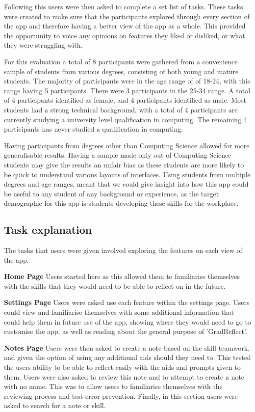 \documentclass{l4proj}
\begin{document}
Following this users were then asked to complete a set list of tasks. These tasks were created to make sure that the participants explored through every section of the app and therefore having a better view of the app as a whole. This provided the opportunity to voice any opinions on features they liked or disliked, or what they were struggling with. 

For this evaluation a total of 8 participants were gathered from a convenience sample of students from various degrees, consisting of both young and mature students. The majority of participants were in the age range of of 18-24, with this range having 5 participants. There were 3 participants in the 25-34 range. A total of 4 participants identified as female, and 4 participants identified as male. Most students had a strong technical background, with a total of 4 participants are currently studying a university level qualification in computing. The remaining 4 participants has never studied a qualification in computing.

Having participants from degrees other than Computing Science allowed for more generalisable results. Having a sample made only out of Computing Science students may give the results an unfair bias as these students are more likely to be quick to understand various layouts of interfaces. Using students from multiple degrees and age ranges, meant that we could give insight into how this app could be useful to any student of any background or experience, as the target demographic for this app is students developing these skills for the workplace.

\subsection{Task explanation}

The tasks that users were given involved exploring the features on each view of the app.

\textbf{Home Page} Users started here as this allowed them to familiarise themselves with the skills that they would need to be able to reflect on in the future. 
 
\textbf{Settings Page} Users were asked use each feature within the settings page. Users could view and familiarise themselves with some additional information that could help them in future use of the app, showing where they would need to go to customise the app, as well as reading about the general purpose of 'GradReflect'.

\textbf{Notes Page} Users were then asked to create a note based on the skill teamwork, and given the option of using any additional aids should they need to. This tested the users ability to be able to reflect easily with the aids and prompts given to them. Users were also asked to review this note and to attempt to create a note with no name. This was to allow users to familiarise themselves with the reviewing process and test error prevention. Finally, in this section users were asked to search for a note or skill.
 
\end{document}
